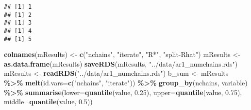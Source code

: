 \documentclass[
]{article}
\newenvironment{Shaded}{\begin{snugshade}}{\end{snugshade}}
\newcommand{\AttributeTok}[1]{\textcolor[rgb]{0.13,0.29,0.53}{#1}}
\newcommand{\ControlFlowTok}[1]{\textcolor[rgb]{0.13,0.29,0.53}{\textbf{#1}}}
\newcommand{\DecValTok}[1]{\textcolor[rgb]{0.00,0.00,0.81}{#1}}
\newcommand{\FloatTok}[1]{\textcolor[rgb]{0.00,0.00,0.81}{#1}}
\newcommand{\FunctionTok}[1]{\textcolor[rgb]{0.13,0.29,0.53}{\textbf{#1}}}
\newcommand{\NormalTok}[1]{#1}
\newcommand{\OtherTok}[1]{\textcolor[rgb]{0.56,0.35,0.01}{#1}}
\newcommand{\SpecialCharTok}[1]{\textcolor[rgb]{0.81,0.36,0.00}{\textbf{#1}}}
\newcommand{\StringTok}[1]{\textcolor[rgb]{0.31,0.60,0.02}{#1}}
\begin{document}
\begin{Shaded}
\end{Shaded}

\begin{verbatim}
## [1] 1
## [1] 2
## [1] 3
## [1] 4
## [1] 5
\end{verbatim}

\begin{Shaded}
\begin{Highlighting}[]
\FunctionTok{colnames}\NormalTok{(mResults) }\OtherTok{\textless{}{-}} \FunctionTok{c}\NormalTok{(}\StringTok{"nchains"}\NormalTok{, }\StringTok{"iterate"}\NormalTok{, }\StringTok{"R*"}\NormalTok{, }\StringTok{"split{-}Rhat"}\NormalTok{)}
\NormalTok{mResults }\OtherTok{\textless{}{-}} \FunctionTok{as.data.frame}\NormalTok{(mResults)}
\FunctionTok{saveRDS}\NormalTok{(mResults, }\StringTok{"../data/ar1\_numchains.rds"}\NormalTok{)}
\NormalTok{mResults }\OtherTok{\textless{}{-}} \FunctionTok{readRDS}\NormalTok{(}\StringTok{"../data/ar1\_numchains.rds"}\NormalTok{)}
\NormalTok{b\_sum }\OtherTok{\textless{}{-}}\NormalTok{ mResults }\SpecialCharTok{\%\textgreater{}\%} 
  \FunctionTok{melt}\NormalTok{(}\AttributeTok{id.vars=}\FunctionTok{c}\NormalTok{(}\StringTok{"nchains"}\NormalTok{, }\StringTok{"iterate"}\NormalTok{)) }\SpecialCharTok{\%\textgreater{}\%}
  \FunctionTok{group\_by}\NormalTok{(nchains, variable) }\SpecialCharTok{\%\textgreater{}\%} 
  \FunctionTok{summarise}\NormalTok{(}\AttributeTok{lower=}\FunctionTok{quantile}\NormalTok{(value, }\FloatTok{0.25}\NormalTok{),}
         \AttributeTok{upper=}\FunctionTok{quantile}\NormalTok{(value, }\FloatTok{0.75}\NormalTok{),}
         \AttributeTok{middle=}\FunctionTok{quantile}\NormalTok{(value, }\FloatTok{0.5}\NormalTok{))}
\end{Highlighting}
\end{Shaded}
\end{document}
